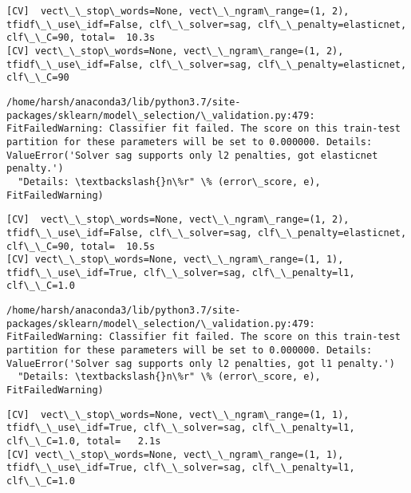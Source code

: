 \documentclass[11pt]{article}
\begin{document}
    \begin{Verbatim}[commandchars=\\\{\}]
[CV]  vect\_\_stop\_words=None, vect\_\_ngram\_range=(1, 2), tfidf\_\_use\_idf=False, clf\_\_solver=sag, clf\_\_penalty=elasticnet, clf\_\_C=90, total=  10.3s
[CV] vect\_\_stop\_words=None, vect\_\_ngram\_range=(1, 2), tfidf\_\_use\_idf=False, clf\_\_solver=sag, clf\_\_penalty=elasticnet, clf\_\_C=90 

    \end{Verbatim}

    \begin{Verbatim}[commandchars=\\\{\}]
/home/harsh/anaconda3/lib/python3.7/site-packages/sklearn/model\_selection/\_validation.py:479: FitFailedWarning: Classifier fit failed. The score on this train-test partition for these parameters will be set to 0.000000. Details: 
ValueError('Solver sag supports only l2 penalties, got elasticnet penalty.')
  "Details: \textbackslash{}n\%r" \% (error\_score, e), FitFailedWarning)

    \end{Verbatim}

    \begin{Verbatim}[commandchars=\\\{\}]
[CV]  vect\_\_stop\_words=None, vect\_\_ngram\_range=(1, 2), tfidf\_\_use\_idf=False, clf\_\_solver=sag, clf\_\_penalty=elasticnet, clf\_\_C=90, total=  10.5s
[CV] vect\_\_stop\_words=None, vect\_\_ngram\_range=(1, 1), tfidf\_\_use\_idf=True, clf\_\_solver=sag, clf\_\_penalty=l1, clf\_\_C=1.0 

    \end{Verbatim}

    \begin{Verbatim}[commandchars=\\\{\}]
/home/harsh/anaconda3/lib/python3.7/site-packages/sklearn/model\_selection/\_validation.py:479: FitFailedWarning: Classifier fit failed. The score on this train-test partition for these parameters will be set to 0.000000. Details: 
ValueError('Solver sag supports only l2 penalties, got l1 penalty.')
  "Details: \textbackslash{}n\%r" \% (error\_score, e), FitFailedWarning)

    \end{Verbatim}

    \begin{Verbatim}[commandchars=\\\{\}]
[CV]  vect\_\_stop\_words=None, vect\_\_ngram\_range=(1, 1), tfidf\_\_use\_idf=True, clf\_\_solver=sag, clf\_\_penalty=l1, clf\_\_C=1.0, total=   2.1s
[CV] vect\_\_stop\_words=None, vect\_\_ngram\_range=(1, 1), tfidf\_\_use\_idf=True, clf\_\_solver=sag, clf\_\_penalty=l1, clf\_\_C=1.0 

    \end{Verbatim}
\end{document}

